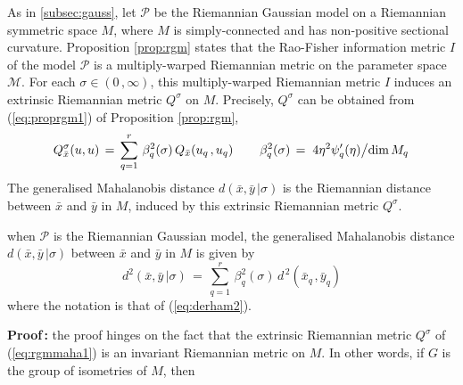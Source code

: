 \documentclass{svmult}
\begin{document}
As in \ref{subsec:gauss}, let $\mathcal{P}$ be the Riemannian Gaussian model on a Riemannian symmetric space $M$, where $M$ is simply-connected and has non-positive sectional curvature. Proposition \ref{prop:rgm} states that the Rao-Fisher information metric $I$ of the model $\mathcal{P}$ is a multiply-warped Riemannian metric on the parameter space $\mathcal{M}$. For each $\sigma \in (0\,,\infty)$, this multiply-warped Riemannian metric $I$ induces an extrinsic Riemannian metric $Q^\sigma$ on $M$. Precisely, $Q^\sigma$ can be obtained from (\ref{eq:proprgm1}) of Proposition \ref{prop:rgm},
\begin{equation} \label{eq:rgmmaha1}
 Q^\sigma_{\bar{x}}(u,u) \,= \, \sum^r_{q=1}\,\beta^2_q(\sigma)\,Q_{\bar{x}}(u_{q\,},u_q) \hspace{0.75cm}
\beta^2_q(\sigma) \,=\, \left.4\eta^2\psi^\prime_q(\eta)\middle/\mathrm{dim}\,M_q\right.
\end{equation}
The generalised Mahalanobis distance $d(\bar{x},\bar{y}\,|\sigma)$ is the Riemannian distance between $\bar{x}$ and $\bar{y}$ in $M$, induced by this extrinsic Riemannian metric $Q^\sigma$. 
\begin{proposition} \label{prop:maha2}
when $\mathcal{P}$ is the Riemannian Gaussian model, the generalised Mahalanobis distance $d(\bar{x},\bar{y}\,|\sigma)$ between $\bar{x}$ and $\bar{y}$ in $M$ is given by
\begin{equation} \label{eq:mahalanobisrgm} 
  d^2(\bar{x},\bar{y}\,|\sigma) \,=\, \sum^r_{q=1}\,\beta^2_q(\sigma)\,d^{\,2}(\bar{x}_{q\,},\bar{y}_q)
\end{equation}
where the notation is that of (\ref{eq:derham2}).
\end{proposition}
\textbf{Proof\,:} the proof hinges on the fact that the extrinsic Riemannian metric $Q^\sigma$ of (\ref{eq:rgmmaha1}) is an invariant Riemannian metric on $M$. In other words, if $G$ is the group of isometries of $M$, then
\end{document}
